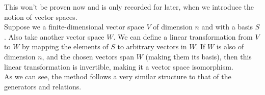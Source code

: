 \documentclass[12pt]{article}
\begin{document}
    This won't be proven now and is only recorded for later,
    when we introduce the notion of vector spaces. \\
    Suppose we a finite-dimensional vector space $V$ of dimension $n$
    and with a basis $S$.
    Also take another vector space $W$.
    We can define a linear transformation from $V$ to $W$
    by mapping the elements of $S$ to arbitrary vectors in $W$.
    If $W$ is also of dimension $n$,
    and the chosen vectors span $W$ (making them its basis),
    then this linear transformation is invertible,
    making it a vector space isomorphism. \\
    As we can see, the method follows a very similar structure
    to that of the generators and relations. \\

   
\end{document}
